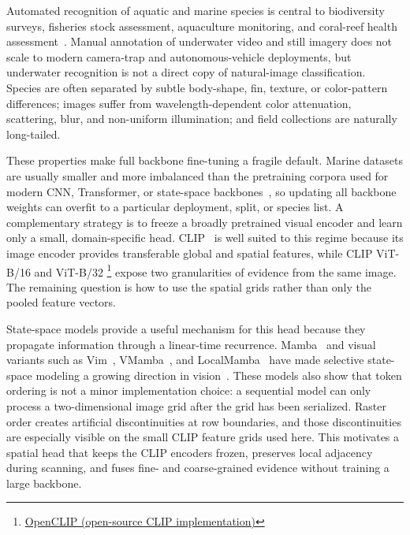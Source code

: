 \documentclass[runningheads]{llncs}
\begin{document}
Automated recognition of aquatic and marine species is central to biodiversity surveys, fisheries stock assessment, aquaculture monitoring, and coral-reef health assessment~\cite{gonzalez2023underwater}. Manual annotation of underwater video and still imagery does not scale to modern camera-trap and autonomous-vehicle deployments, but underwater recognition is not a direct copy of natural-image classification. Species are often separated by subtle body-shape, fin, texture, or color-pattern differences; images suffer from wavelength-dependent color attenuation, scattering, blur, and non-uniform illumination; and field collections are naturally long-tailed.

These properties make full backbone fine-tuning a fragile default. Marine datasets are usually smaller and more imbalanced than the pretraining corpora used for modern CNN, Transformer, or state-space backbones~\cite{he2016resnet,dosovitskiy2021vit,gu2024mamba}, so updating all backbone weights can overfit to a particular deployment, split, or species list. A complementary strategy is to freeze a broadly pretrained visual encoder and learn only a small, domain-specific head. CLIP~\cite{radford2021clip} is well suited to this regime because its image encoder provides transferable global and spatial features, while CLIP ViT-B/16 and ViT-B/32 \footnote{\href{https://github.com/mlfoundations/open_clip}{OpenCLIP (open-source CLIP implementation)}} expose two granularities of evidence from the same image. The remaining question is how to use the spatial grids rather than only the pooled feature vectors.

State-space models provide a useful mechanism for this head because they propagate information through a linear-time recurrence. Mamba~\cite{gu2024mamba} and visual variants such as Vim~\cite{zhu2024vim}, VMamba~\cite{liu2024vmamba}, and LocalMamba~\cite{huang2024localmamba} have made selective state-space modeling a growing direction in vision~\cite{zhang2024visualmambasurvey}. These models also show that token ordering is not a minor implementation choice: a sequential model can only process a two-dimensional image grid after the grid has been serialized. Raster order creates artificial discontinuities at row boundaries, and those discontinuities are especially visible on the small CLIP feature grids used here. This motivates a spatial head that keeps the CLIP encoders frozen, preserves local adjacency during scanning, and fuses fine- and coarse-grained evidence without training a large backbone.
\end{document}
